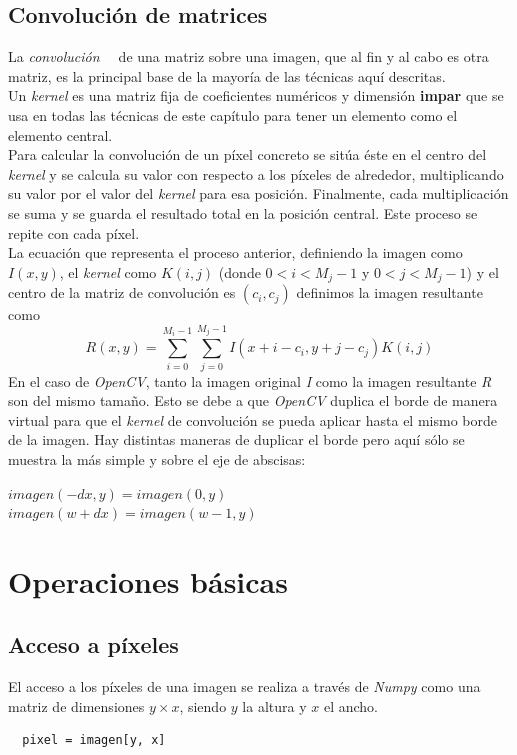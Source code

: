 \subsection{Convolución de matrices}
La \emph{convolución}\emph{~\citep*[3.2 Linear
  filtering]{szeliski2010computer}}\emph{~\citep*[A.6
  Convolution]{fisher1996hypermedia}} de una matriz sobre una imagen,
que al fin y al cabo es otra matriz, es la principal base de la
mayoría de las técnicas aquí descritas. \\
Un \emph{kernel} es una matriz fija de coeficientes numéricos y
dimensión \textbf{impar} que se usa en todas las técnicas de este
capítulo para tener un elemento como el elemento central. \\
Para calcular la convolución de un píxel concreto se sitúa éste en el
centro del \emph{kernel} y se calcula su valor con respecto a los
píxeles de alrededor, multiplicando su valor por el valor del
\emph{kernel} para esa posición. Finalmente, cada multiplicación se
suma y se guarda el resultado total en la posición central. Este
proceso se repite con cada píxel. \\
La ecuación que representa el proceso anterior, definiendo la imagen
como $I(x, y)$, el \emph{kernel} como $K(i, j)$ (donde
$0 < i < M_j - 1$ y $0 < j < M_j - 1$) y el centro de la matriz de
convolución es $(c_i, c_j)$ definimos la imagen resultante como
\begin{equation*}
  R(x, y) = \sum_{i=0}^{M_i-1} \sum_{j=0}^{M_j-1}  I(x + i - c_i, y + j - c_j)K(i,j)
\end{equation*}
En el caso de \emph{OpenCV}, tanto la imagen original \emph{I} como la
imagen resultante \emph{R} son del mismo tamaño. Esto se debe a que
\emph{OpenCV} duplica el borde de manera virtual para que el
\emph{kernel} de convolución se pueda aplicar hasta el mismo borde de
la imagen. Hay distintas maneras de duplicar el borde pero aquí sólo
se muestra la más simple y sobre el eje de abscisas:
\begin{center}
  $imagen(-dx, y) = imagen(0, y)$
  \\
  $imagen(w + dx) = imagen(w - 1, y)$
\end{center}


\section{Operaciones básicas}
\subsection{Acceso a píxeles}
El acceso a los píxeles de una imagen se realiza a través de
\emph{Numpy} como una matriz de dimensiones $y \times x$, siendo $y$
la altura y $x$ el ancho.
\begin{verbatim}
  pixel = imagen[y, x]
\end{verbatim}

